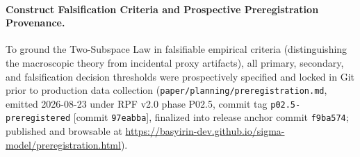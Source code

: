 \documentclass{article}
\theoremstyle{plain}
\theoremstyle{definition}
\begin{document}
\paragraph{Construct Falsification Criteria and Prospective Preregistration Provenance.}
\label{sec:falsification_criteria}
To ground the Two-Subspace Law in falsifiable empirical criteria (distinguishing the macroscopic theory from incidental proxy artifacts), all primary, secondary, and falsification decision thresholds were prospectively specified and locked in Git prior to production data collection (\texttt{paper/planning/preregistration.md}, emitted 2026-08-23 under RPF v2.0 phase P02.5, commit tag \texttt{p02.5-preregistered} [commit \texttt{97eabba}], finalized into release anchor commit \texttt{f9ba574}; published and browsable at \url{https://basyirin-dev.github.io/sigma-model/preregistration.html}).
\end{document}
